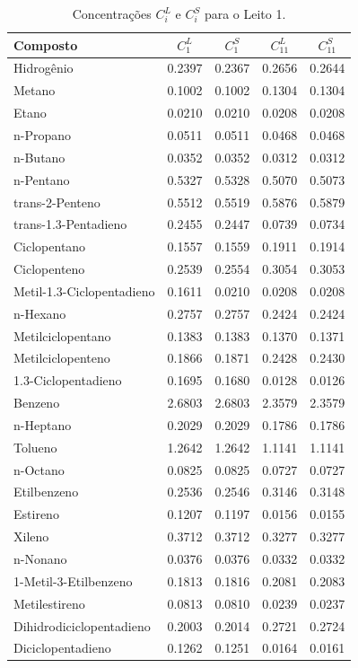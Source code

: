 \begin{table}[!htb]
\begin{center}
\caption{Concentrações $C^L_{i}$ e $C^S_{i}$ para o Leito 1.}
\label{tab:concentraçõesparaoleito1}
\small
\begin{tabular}{lcccc}
{Composto} & {$C^{L}_{1}$} & {$C^{S}_{1}$} & {$C^{L}_{11}$} & {$C^{S}_{11}$}
\\
\hline
{Hidrogênio} & 0.2397 & 0.2367 & 0.2656 & 0.2644 \\
{Metano} & 0.1002 & 0.1002 & 0.1304 & 0.1304 \\
{Etano} & 0.0210 & 0.0210 & 0.0208 & 0.0208 \\
{n-Propano} & 0.0511 & 0.0511 & 0.0468 & 0.0468 \\
{n-Butano} & 0.0352 & 0.0352 & 0.0312 & 0.0312 \\
{n-Pentano} & 0.5327 & 0.5328 & 0.5070 & 0.5073 \\
{trans-2-Penteno} & 0.5512 & 0.5519 & 0.5876 & 0.5879 \\
{trans-1.3-Pentadieno} & 0.2455 & 0.2447 & 0.0739 & 0.0734 \\
{Ciclopentano} & 0.1557 & 0.1559 & 0.1911 & 0.1914 \\
{Ciclopenteno} & 0.2539 & 0.2554 & 0.3054 & 0.3053 \\
{Metil-1.3-Ciclopentadieno} & 0.1611 & 0.0210 & 0.0208 & 0.0208 \\
{n-Hexano} & 0.2757 & 0.2757 & 0.2424 & 0.2424 \\
{Metilciclopentano} & 0.1383 & 0.1383 & 0.1370 & 0.1371 \\
{Metilciclopenteno} & 0.1866 & 0.1871 & 0.2428 & 0.2430 \\
{1.3-Ciclopentadieno} & 0.1695 & 0.1680 & 0.0128 & 0.0126 \\
{Benzeno} & 2.6803 & 2.6803 & 2.3579 & 2.3579 \\
{n-Heptano} & 0.2029 & 0.2029 & 0.1786 & 0.1786 \\
{Tolueno} & 1.2642 & 1.2642 & 1.1141 & 1.1141 \\
{n-Octano} & 0.0825 & 0.0825 & 0.0727 & 0.0727 \\
{Etilbenzeno} & 0.2536 & 0.2546 & 0.3146 & 0.3148 \\
{Estireno} & 0.1207 & 0.1197 & 0.0156 & 0.0155 \\
{Xileno} & 0.3712 & 0.3712 & 0.3277 & 0.3277 \\
{n-Nonano} & 0.0376 & 0.0376 & 0.0332 & 0.0332 \\
{1-Metil-3-Etilbenzeno} & 0.1813 & 0.1816 & 0.2081 & 0.2083 \\
{Metilestireno} & 0.0813 & 0.0810 & 0.0239 & 0.0237 \\
{Dihidrodiciclopentadieno} & 0.2003 & 0.2014 & 0.2721 & 0.2724 \\
{Diciclopentadieno} & 0.1262 & 0.1251 & 0.0164 & 0.0161 \\
\bottomrule
\end{tabular}
\end{center}
\end{table}

